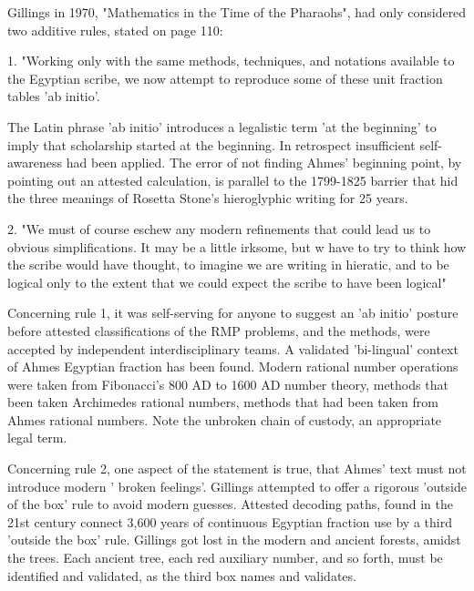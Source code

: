 \documentclass[12pt]{article}
\begin{document}
Gillings in 1970, "Mathematics in the Time of the Pharaohs", had only considered two additive rules, stated on page 110:

1. "Working only with the same methods, techniques, and notations available to the Egyptian scribe, we now attempt to reproduce some of these unit fraction tables 'ab initio'.

The Latin phrase 'ab initio' introduces a legalistic term 'at the beginning' to imply that scholarship started at the beginning. In retrospect insufficient self-awareness had been applied. The error of not finding Ahmes' beginning point, by pointing out an attested calculation, is parallel to the 1799-1825 barrier that hid the three meanings of Rosetta Stone's hieroglyphic writing for 25 years.

2. "We must of course eschew any modern refinements that could lead us to obvious simplifications. It may be a little irksome, but w have to try to think how the scribe would have thought, to imagine we are writing in hieratic, and to be logical only to the extent that we could expect the scribe to have been logical" 

Concerning rule 1, it was self-serving for anyone to suggest an 'ab initio' posture before attested classifications of the RMP problems, and the methods, were accepted by independent interdisciplinary teams. A  validated 'bi-lingual' context of Ahmes Egyptian fraction has been found. Modern rational number operations were taken from Fibonacci's 800 AD to 1600 AD number theory, methods that been taken Archimedes rational numbers, methods that had been taken from Ahmes rational numbers. Note the unbroken chain of custody, an appropriate legal term. 

Concerning rule 2, one aspect of the statement is true, that Ahmes' text must not introduce modern ' broken feelings'. Gillings attempted to offer a rigorous 'outside of the box' rule to avoid modern guesses. Attested decoding paths, found in the 21st century connect 3,600 years of continuous Egyptian fraction use by a third 'outside the box' rule. Gillings got lost in the modern and ancient forests, amidst the trees. Each ancient tree, each red auxiliary number, and so forth, must be identified and validated, as the third box names and validates.
\end{document}
